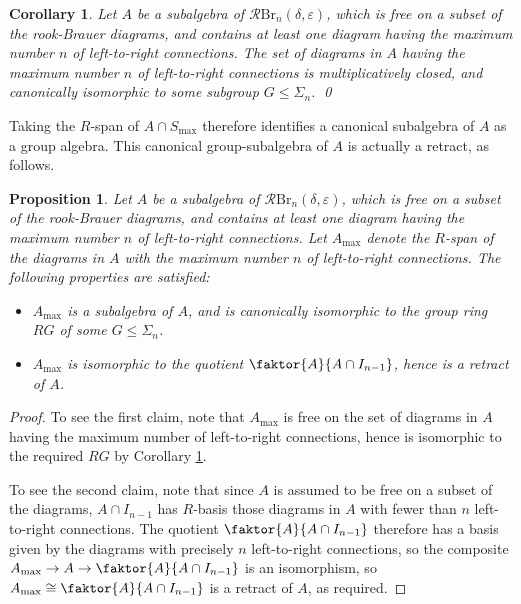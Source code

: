\documentclass[12pt]{amsart}
\theoremstyle{plain}
\theoremstyle{definition} \newtheorem{definition}[theorem]{Definition}
\theoremstyle{plain}
\theoremstyle{plain} \newtheorem{proposition}[theorem]{Proposition}
\theoremstyle{plain} \newtheorem{conjecture}[theorem]{Conjecture}
\theoremstyle{plain} \newtheorem{corollary}[theorem]{Corollary}
\theoremstyle{remark} \newtheorem{claim}[theorem]{Claim}
\theoremstyle{remark} \newtheorem{remark}[theorem]{Remark}
\theoremstyle{remark} \newtheorem{example}[theorem]{Example}
\theoremstyle{remark} \newtheorem{comment}[theorem]{Comment}
\theoremstyle{definition} \newtheorem{question}[theorem]{Question}
\newcommand{\rook}{\mathcal{R}}
\newcommand{\Brauer}{\mathrm{Br}}
\begin{document}
\begin{corollary} \label{subgroup} Let $A$ be a subalgebra of $\rook \Brauer_n(\delta, \varepsilon)$, which is free on a subset of the rook-Brauer diagrams, and contains at least one diagram having the maximum number $n$ of left-to-right connections. The set of diagrams in $A$ having the maximum number $n$ of left-to-right connections is multiplicatively closed, and canonically isomorphic to some subgroup $G \leq \Sigma_n$. \qed \end{corollary}

Taking the $R$-span of $A \cap S_{\max}$ therefore identifies a canonical subalgebra of $A$ as a group algebra. This canonical group-subalgebra of $A$ is actually a retract, as follows.

\begin{proposition} \label{retract} Let $A$ be a subalgebra of $\rook \Brauer_n(\delta, \varepsilon)$, which is free on a subset of the rook-Brauer diagrams, and contains at least one diagram having the maximum number $n$ of left-to-right connections. Let $A_{\max}$ denote the $R$-span of the diagrams in $A$ with the maximum number $n$ of left-to-right connections. The following properties are satisfied:
\begin{itemize}
    \item $A_{\max}$ is a subalgebra of $A$, and is canonically isomorphic to the group ring $RG$ of some $G \leq \Sigma_n$.
    \item $A_{\max}$ is isomorphic to the quotient $\faktor{A}{A \cap I_{n-1}}$, hence is a retract of $A$.
\end{itemize} \end{proposition}

\begin{proof} To see the first claim, note that $A_{\max}$ is free on the set of diagrams in $A$ having the maximum number of left-to-right connections, hence is isomorphic to the required $RG$ by Corollary \ref{subgroup}.

To see the second claim, note that since $A$ is assumed to be free on a subset of the diagrams, $A \cap I_{n-1}$ has $R$-basis those diagrams in $A$ with fewer than $n$ left-to-right connections. The quotient $\faktor{A}{A \cap I_{n-1}}$ therefore has a basis given by the diagrams with precisely $n$ left-to-right connections, so the composite $A_{\max} \to A \to \faktor{A}{A \cap I_{n-1}}$ is an isomorphism, so $A_{\max} \cong \faktor{A}{A \cap I_{n-1}}$ is a retract of $A$, as required.
\end{proof}
\end{document}
